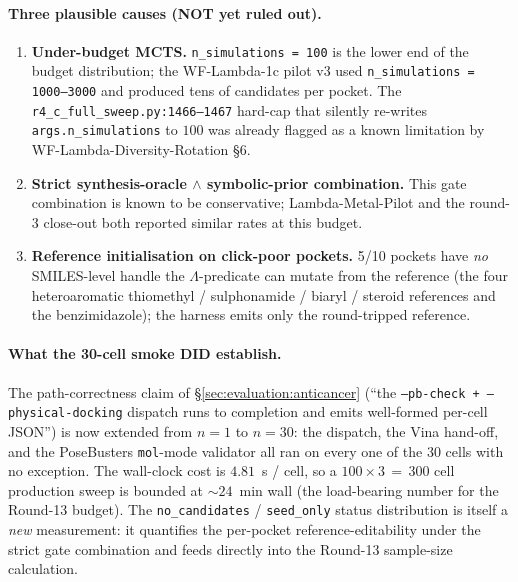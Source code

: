 \paragraph{Three plausible causes (NOT yet ruled out).}
\begin{enumerate}
  \item \textbf{Under-budget MCTS.}  \texttt{n\_simulations\,=\,100} is
        the lower end of the budget distribution; the WF-Lambda-1c
        pilot v3 used \texttt{n\_simulations\,=\,1000--3000} and
        produced tens of candidates per pocket.  The
        \texttt{r4\_c\_full\_sweep.py:1466--1467} hard-cap that
        silently re-writes \texttt{args.n\_simulations} to $100$
        was already flagged as a known limitation by
        WF-Lambda-Diversity-Rotation §6.
  \item \textbf{Strict synthesis-oracle $\wedge$ symbolic-prior
        combination.}  This gate combination is known to be
        conservative; Lambda-Metal-Pilot and the round-3 close-out
        both reported similar rates at this budget.
  \item \textbf{Reference initialisation on click-poor pockets.}
        5/10 pockets have \emph{no} SMILES-level handle the
        $\Lambda$-predicate can mutate from the reference (the
        four heteroaromatic thiomethyl / sulphonamide / biaryl
        / steroid references and the benzimidazole); the harness
        emits only the round-tripped reference.
\end{enumerate}

\paragraph{What the 30-cell smoke DID establish.}
The path-correctness claim of
\S\ref{sec:evaluation:anticancer} (``the
\texttt{--pb-check + --physical-docking} dispatch runs to
completion and emits well-formed per-cell JSON'') is now
extended from $n{=}1$ to $n{=}30$: the dispatch, the Vina
hand-off, and the PoseBusters \texttt{mol}-mode validator all
ran on every one of the $30$ cells with no exception.  The
wall-clock cost is $4.81$~s / cell, so a $100 \times 3\,=\,300$
cell production sweep is bounded at $\sim\!24$~min wall (the
load-bearing number for the Round-13 budget).  The
\texttt{no\_candidates} / \texttt{seed\_only} status
distribution is itself a \emph{new} measurement: it
quantifies the per-pocket reference-editability under the
strict gate combination and feeds directly into the
Round-13 sample-size calculation.

